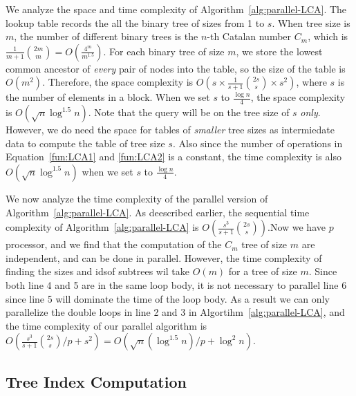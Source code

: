 We analyze the space and time complexity of
Algorithm~\ref{alg:parallel-LCA}.  The lookup table records the all
the binary tree of sizes from 1 to $s$.  When tree size is $m$, the
number of different binary trees is the $n$-th Catalan number $C_m$,
which is $\frac{1}{m+1}\binom{2m}{m} = O(\frac{4^m}{m^{1.5}})$.  For
each binary tree of size $m$, we store the lowest common ancestor of
{\em every} pair of nodes into the table, so the size of the table is
$O(m^2)$.  Therefore, the space complexity is $O(s \times
\frac{1}{s+1}\binom{2s}{s} \times s^2)$, where $s$ is the number of
elements in a block.  When we set $s$ to $\frac{\log n}{4}$, the space
complexity is $O(\sqrt{n} \log ^{1.5} n)$.  Note that the query will
be on the tree size of $s$ {\em only}.  However, we do need the space
for tables of {\em smaller} tree sizes as intermiedate data to compute
the table of tree size $s$.  Also since the number of operations in
Equation~\ref{fun:LCA1} and \ref{fun:LCA2} is a constant, the time
complexity is also $O(\sqrt{n} \log ^{1.5} n)$ when we set $s$ to
$\frac{\log n}{4}$.

We now analyze the time complexity of the parallel version of
Algorithm~\ref{alg:parallel-LCA}.  As deescribed earlier, the
sequential time complexity of Algorithm~\ref{alg:parallel-LCA} is
$O(\frac{s^3}{s+1} \binom{2s}{s})$.Now we have $p$ processor, and we
find that the computation of the $C_m$ tree of size $m$ are
independent, and can be done in parallel.  However, the time
complexity of finding the sizes and idsof subtrees wil take $O(m)$ for
a tree of size $m$.  Since both line 4 and 5 are in the same loop
body, it is not necessary to parallel line 6 since line 5 will
dominate the time of the loop body.  As a result we can only
parallelize the double loops in line 2 and 3 in
Algortihm~\ref{alg:parallel-LCA}, and the time complexity of our
parallel algorithm is $O(\frac{s^3}{s+1} \binom{2s}{s} / p + s^2) =
O(\sqrt{n} (\log ^{1.5} n) / p + \log^2 n )$.







\subsection{Tree Index Computation}

